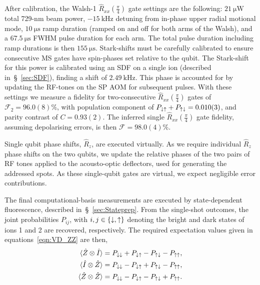 After calibration, the Walsh-1 $\hat R_{xx}(\frac{\pi}{4})$ gate settings are the following:
$21~\unit{\micro\watt}$ total 729-nm beam power, $-15~\unit{\kilo\hertz}$ detuning from in-phase upper radial motional mode, $10~\unit{\micro\second}$ ramp duration (ramped on and off for both arms of the Walsh), and a $67.5~\unit{\micro\second}$ FWHM pulse duration for each arm. The total pulse duration including ramp durations is then $155~\unit{\micro\second}$.
Stark-shifts must be carefully calibrated to ensure consecutive MS gates have spin-phases set relative to the qubit. The Stark-shift for this power is calibrated using an SDF on a single ion (described in~\S~\ref{sec:SDF}), finding a shift of $2.49~\unit{\kilo\hertz}$. This phase is accounted for by updating the RF-tones on the SP AOM for subsequent pulses.
With these settings we measure a fidelity for two-consecutive $\hat R_{xx}(\frac{\pi}{4})$ gates of $\mathcal{F}_2 = 96.0(8)\%$, with population component of $P_{\downarrow\uparrow}+P_{\uparrow\downarrow}=0.010(3)$, and parity contrast of $C=0.93(2)$. The inferred single $\hat R_{xx}(\frac{\pi}{4})$  gate fidelity, assuming depolarising errors, is then $\mathcal{F} = 98.0(4)\%$. 

Single qubit phase shifts, 
$\hat R_z$, are executed virtually. As we require individual $\hat R_z$ phase shifts on the two qubits, we update the relative phases of the two
pairs of RF tones applied to the acousto-optic deflectors, used for generating the addressed spots. As these single-qubit gates are virtual, we expect negligible error contributions.

The final
computational-basis measurements are executed by state-dependent fluorescence,
described in~\S~\ref{sec:Stateprep}. 
From the single-shot outcomes, the joint probabilities $P_{ij}$, with $i,j\in\{\downarrow,\uparrow\}$ denoting the bright and dark states of ions 1 and 2 are recovered, respectively.
The required expectation values given in equations~\ref{eqn:VD_ZZ} are then,
\begin{subequations}
\label{eqn:bmat_jointprobs}
    \begin{align}
\langle \hat Z\otimes \hat I\rangle
    &= P_{\downarrow\downarrow}+P_{\downarrow\uparrow}-P_{\uparrow\downarrow}-P_{\uparrow\uparrow},\\
\langle \hat I\otimes \hat Z\rangle
    &= P_{\downarrow\downarrow}-P_{\downarrow\uparrow}+P_{\uparrow\downarrow}-P_{\uparrow\uparrow},\\
\langle \hat Z\otimes \hat Z\rangle
    &= P_{\downarrow\downarrow}-P_{\downarrow\uparrow}-P_{\uparrow\downarrow}+P_{\uparrow\uparrow}.
\end{align}
\end{subequations}

